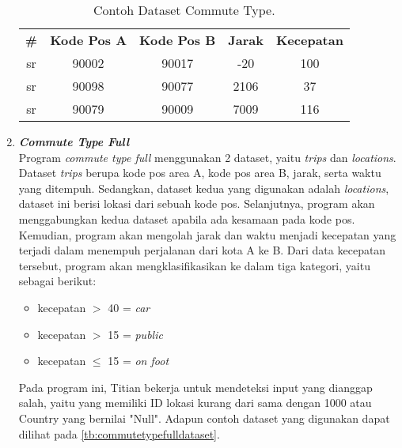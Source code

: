 \begin{enumerate}
            \begin{longtable}{|c|c|c|c|c|}
                  \caption{Contoh Dataset Commute Type.}
                  \label{tb:commutetypedataset} \\
                  \hline
                  \rowcolor[HTML]{C0C0C0}
                  \textbf{\#} & \textbf{Kode Pos A} & \textbf{Kode Pos B} & \textbf{Jarak} & \textbf{Kecepatan} \\
                  sr & 90002 & 90017 & -20 & 100 \\
                  sr & 90098 & 90077 & 2106 & 37 \\
                  sr & 90079 & 90009 & 7009 & 116 \\
                  \hline
            \end{longtable}

      \item \emph{\textbf{Commute Type Full}} \\
      

            Program \emph{commute type full} menggunakan 2 dataset, 
            yaitu \emph{trips} dan \emph{locations}. Dataset 
            \emph{trips} berupa kode pos area A, kode pos area B, 
            jarak, serta waktu yang ditempuh. Sedangkan, dataset 
            kedua yang digunakan adalah \emph{locations}, dataset 
            ini berisi lokasi dari sebuah kode pos. Selanjutnya, 
            program akan menggabungkan kedua dataset apabila ada 
            kesamaan pada kode pos. Kemudian, program akan mengolah 
            jarak dan waktu menjadi kecepatan yang terjadi dalam 
            menempuh perjalanan dari kota A ke B. Dari data kecepatan 
            tersebut, program akan mengklasifikasikan ke dalam tiga 
            kategori, yaitu sebagai berikut:
            \begin{itemize}
                  \item kecepatan $ > $ 40 = \emph{car}
                  \item kecepatan $ > $ 15 = \emph{public}
                  \item kecepatan $ \leq $ 15 = \emph{on foot}
            \end{itemize}
            Pada program ini, Titian bekerja untuk mendeteksi input yang dianggap salah, yaitu yang memiliki ID lokasi kurang dari sama dengan 1000 atau Country yang bernilai "Null".
            Adapun contoh dataset yang digunakan dapat 
            dilihat pada \ref{tb:commutetypefulldataset}.
            

\end{enumerate}
